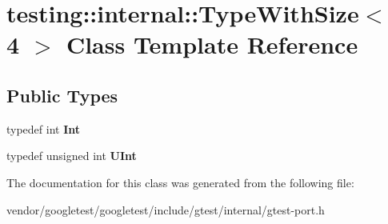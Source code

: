 \hypertarget{classtesting_1_1internal_1_1TypeWithSize_3_014_01_4}{}\section{testing\+:\+:internal\+:\+:Type\+With\+Size$<$ 4 $>$ Class Template Reference}
\label{classtesting_1_1internal_1_1TypeWithSize_3_014_01_4}
\subsection*{Public Types}
\begin{DoxyCompactItemize}
\item 
typedef int {\bfseries Int}\hypertarget{classtesting_1_1internal_1_1TypeWithSize_3_014_01_4_a80351860c00ed665e73f952143f4484a}{}\label{classtesting_1_1internal_1_1TypeWithSize_3_014_01_4_a80351860c00ed665e73f952143f4484a}

\item 
typedef unsigned int {\bfseries U\+Int}\hypertarget{classtesting_1_1internal_1_1TypeWithSize_3_014_01_4_a7d559570f830bf35d095eeb94d98de58}{}\label{classtesting_1_1internal_1_1TypeWithSize_3_014_01_4_a7d559570f830bf35d095eeb94d98de58}

\end{DoxyCompactItemize}


The documentation for this class was generated from the following file\+:\begin{DoxyCompactItemize}
\item 
vendor/googletest/googletest/include/gtest/internal/gtest-\/port.\+h\end{DoxyCompactItemize}
